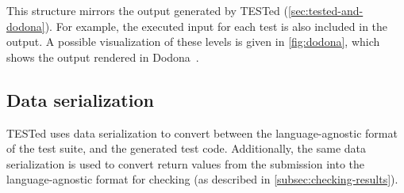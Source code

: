 \documentclass[../main]{subfiles}
\begin{document}
This structure mirrors the output generated by TESTed (\cref{sec:tested-and-dodona}).
For example, the executed input for each test is also included in the output.
A possible visualization of these levels is given in \cref{fig:dodona}, which shows the output rendered in Dodona~\autocite{vanpetegemDodonaLearnCode2023}.

\subsection{Data serialization}\label{subsec:data-serialization}

TESTed uses data serialization to convert between the language-agnostic format of the test suite, and the generated test code.
Additionally, the same data serialization is used to convert return values from the submission into the language-agnostic format for checking (as described in \cref{subsec:checking-results}).
\end{document}

